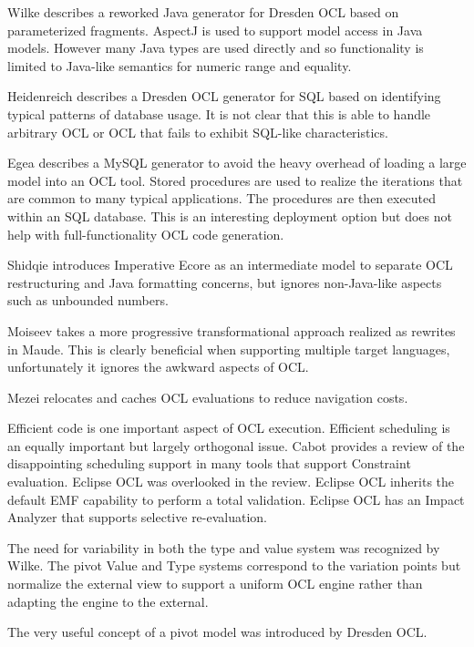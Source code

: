 \documentclass{acm_proc_article-sp}
\begin{document}
Wilke\cite{Dresden/JavaCG} describes a reworked  Java generator for Dresden OCL based on parameterized fragments.
AspectJ is used to support model access in Java models. However many Java types are used directly and so functionality is limited to Java-like semantics for numeric range and equality.

Heidenreich\cite{QueryCode} describes a Dresden OCL generator for SQL based on identifying typical patterns of database usage. It is not clear that this is able to handle arbitrary OCL or OCL that fails to exhibit SQL-like characteristics.

Egea\cite{MySQL4OCL} describes a MySQL generator to avoid the heavy overhead of loading a large model into an OCL tool. Stored procedures are used to realize the iterations that are common to many typical applications. The procedures are then executed within an SQL database. This is an interesting deployment option but does not help with full-functionality OCL code generation.

Shidqie\cite{Shidqie} introduces Imperative Ecore as an intermediate model to separate OCL restructuring and Java formatting concerns, but ignores non-Java-like aspects such as unbounded numbers.

Moiseev\cite{rodion-models2009} takes a more progressive transformational approach realized as rewrites in Maude. This is clearly beneficial when supporting multiple target languages, unfortunately it ignores the awkward aspects of OCL.

Mezei\cite{OCL-relocation} relocates and caches OCL evaluations to reduce navigation costs.

Efficient code is one important aspect of OCL execution. Efficient scheduling is an equally important
but largely orthogonal issue. 
Cabot\cite{Constraint-Survey} provides a review of the disappointing scheduling
support in many tools that support Constraint evaluation.
Eclipse OCL was overlooked in the review. Eclipse OCL inherits the default EMF capability
to perform a total validation. Eclipse OCL has an Impact Analyzer that supports selective re-evaluation.

The need for variability in both the type and value system was recognized by Wilke\cite{Variability}. The pivot Value
and Type systems correspond to the variation points but normalize the external view to support a uniform OCL engine rather than adapting the engine to the external.

The very useful concept of a pivot\cite{Pivot} model was introduced by Dresden OCL.
\end{document}
